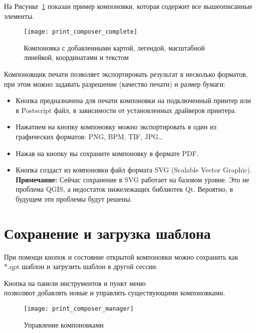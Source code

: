 На Рисунке~\ref{fig:print_composer_complete} показан пример компоновки,
которая содержит все вышеописанные элементы.

\begin{figure}[h]
   \centering
   \texttt{[image: print\_composer\_complete]}
   \caption{Компоновка с добавленными картой, легендой, масштабной линейкой, координатами и текстом \wincaption} \label{fig:print_composer_complete}
\end{figure}

Компоновщик печати позволяет экспортировать результат в несколько
форматов, при этом можно задавать разрешение (качество печати) и размер
бумаги:

\begin{itemize}[label=--]
\item Кнопка  предназначена для
печати компоновки на подключенный принтер или в Postscript файл, в
зависимости от установленных драйверов принтера.
\item Нажатием на кнопку
компоновку можно экспортировать в один из графических форматов: PNG,
BPM, TIF, JPG\dots
\item Нажав на кнопку  вы
сохраните компоновку в формате PDF.
\item Кнопка  создаст из
компоновки файл формата SVG (Scalable Vector Graphic).
\textbf{Примечание:} Сейчас сохранение в SVG работает на базовом уровне.
Это не проблема QGIS, а недостаток нижележащих библиотек Qt. Вероятно,
в будущем эти проблемы будут решены.
\end{itemize}

\section{Сохранение и загрузка шаблона}

При помощи кнопок 
и  состояние открытой
компоновки можно сохранить как *.qpt шаблон и загрузить шаблон в другой
сессии.

Кнопка 
на панели инструментов и пункт меню \\
 \arrow {}
позволяют добавлять новые и управлять существующими компоновками.

\begin{figure}[h]
   \centering
   \texttt{[image: print\_composer\_manager]}
   \caption{Управление компоновками \wincaption}
   \label{fig:print_composer_manager}
\end{figure}

\FloatBarrier
